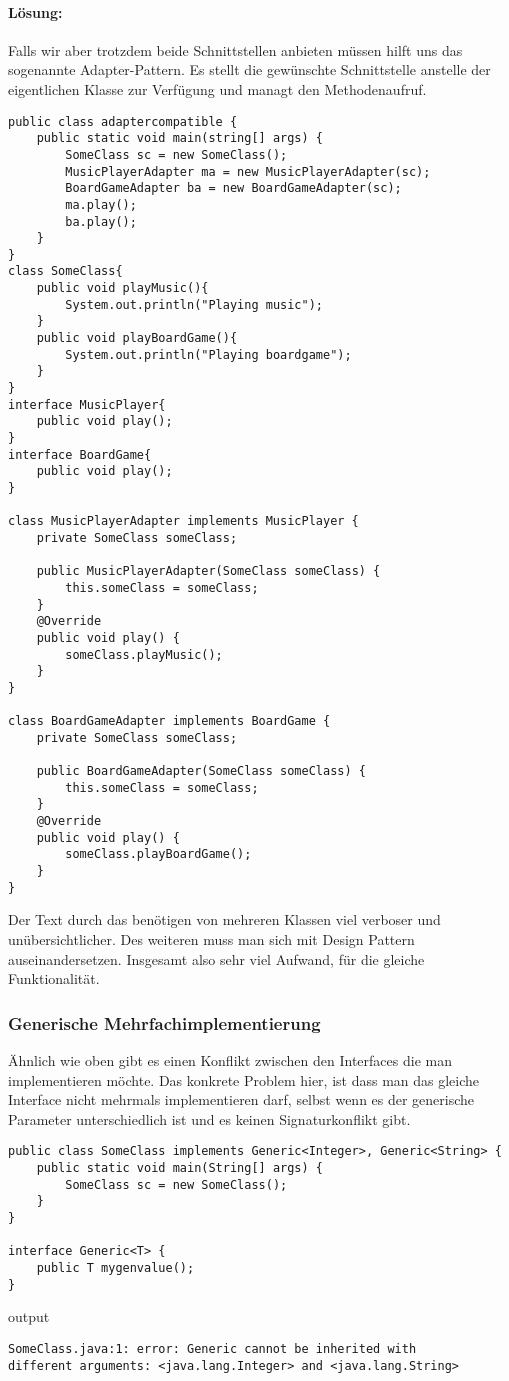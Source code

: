 \documentclass[a4paper, 1ppt]{article}
\begin{document}
\paragraph{Lösung:}
Falls wir aber trotzdem beide Schnittstellen anbieten müssen hilft uns das sogenannte Adapter-Pattern\cite{websitedesignpatterns}.
Es stellt die gewünschte Schnittstelle anstelle der eigentlichen Klasse zur Verfügung und managt den Methodenaufruf.
\begin{verbatim}
public class adaptercompatible {
    public static void main(string[] args) {
        SomeClass sc = new SomeClass();
        MusicPlayerAdapter ma = new MusicPlayerAdapter(sc);
        BoardGameAdapter ba = new BoardGameAdapter(sc);
        ma.play();
        ba.play();
    }
}
class SomeClass{
    public void playMusic(){
        System.out.println("Playing music");
    }
    public void playBoardGame(){
        System.out.println("Playing boardgame");
    }
}
interface MusicPlayer{
    public void play();
}
interface BoardGame{
    public void play();
}

class MusicPlayerAdapter implements MusicPlayer {
    private SomeClass someClass;
    
    public MusicPlayerAdapter(SomeClass someClass) {
        this.someClass = someClass;
    }
    @Override
    public void play() {
        someClass.playMusic();
    }
}

class BoardGameAdapter implements BoardGame {
    private SomeClass someClass;
    
    public BoardGameAdapter(SomeClass someClass) {
        this.someClass = someClass;
    }
    @Override
    public void play() {
        someClass.playBoardGame();
    }
}
\end{verbatim}
Der Text durch das benötigen von mehreren Klassen viel verboser und unübersichtlicher. Des weiteren muss man sich mit Design Pattern auseinandersetzen. Insgesamt also sehr viel Aufwand, für die gleiche Funktionalität.
\subsubsection{Generische Mehrfachimplementierung}
Ähnlich wie oben gibt es einen Konflikt zwischen den Interfaces die man implementieren möchte.
Das konkrete Problem hier, ist dass man das gleiche Interface nicht mehrmals implementieren darf, selbst wenn es der generische Parameter unterschiedlich ist und es keinen Signaturkonflikt gibt.
\begin{verbatim}
public class SomeClass implements Generic<Integer>, Generic<String> {
    public static void main(String[] args) {
        SomeClass sc = new SomeClass();
    }
}

interface Generic<T> {
    public T mygenvalue();
}
\end{verbatim}
output
\begin{verbatim}
SomeClass.java:1: error: Generic cannot be inherited with
different arguments: <java.lang.Integer> and <java.lang.String>
\end{verbatim}
\end{document}
